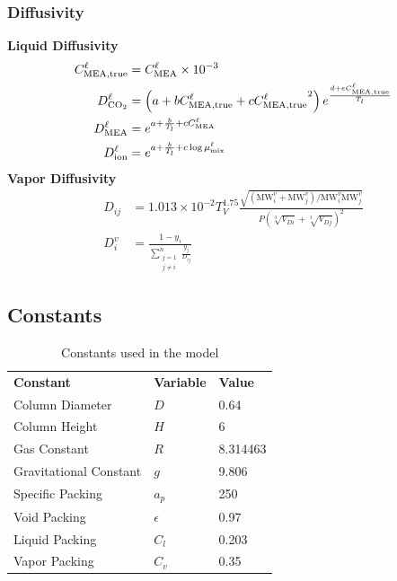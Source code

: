 \documentclass[a4paper,fleqn]{cas-sc}
\newcommand{\COtwo}{{\ce{CO2}}}
\newcommand{\MEA}{{\ce{MEA}}}
\newcommand{\liq}{\ell}
\newcommand{\vap}{v}
\begin{document}
    \subsubsection{Diffusivity}
    \textbf{Liquid Diffusivity}
    \begin{align}
        C^{\liq}_{\MEA,\text{true}} &= C^{\liq}_{\MEA} \times 10^{-3} \\
        D^{\liq}_{ \COtwo} &= \left(a + b C^{\liq}_{\MEA,\text{true}} + c {C^{\liq}_{\MEA,\text{true}}}^2\right) e^{\frac{d + e C^{\liq}_{\MEA,\text{true}}}{T_l}} \\
        D^{\liq}_{ \MEA} &= e^{a + \frac{b}{T_l} + c C^{\liq}_{\MEA}} \\
        D^{\liq}_{ \text{ion}} &= e^{a + \frac{b}{T_l} + c \log{\mu ^{\liq}_{ \text{mix}}}}
    \end{align}
    \vspace{.5cm}
    \textbf{Vapor Diffusivity}
    \begin{align}
        D_{i j} &= 1.013 \times 10^{-2} T_V^{1.75} \frac{\sqrt{\left(\text{MW}^{\vap}_{i}+\text{MW}^{\vap}_{j}\right) / \text{MW}^{\vap}_{i} \text{MW}^{\vap}_{j}}}{P\left(\sqrt[3]{V_{D i}}+\sqrt[3]{V_{D j}}\right)^2} \\
        D^{\vap}_{ i} &= \frac{1-y_i}{\sum_{\substack{j=1 \\ j \neq i}}^n \frac{y_j}{D_{i j}}}
    \end{align}

    \newpage
    \subsection{Constants}

    \begin{longtable}{lll}
        \label{tab:constants_table}\\
        \caption{Constants used in the model} \\
        \hline
        \textbf{Constant}      & \textbf{Variable} & \textbf{Value} \\
        \hline
        \endhead
%
        Column Diameter         & $D$               & 0.64           \\
        Column Height           & $H$               & 6              \\
        Gas Constant            & $R$               & 8.314463       \\
        Gravitational Constant  & $g$               & 9.806          \\
        Specific Packing        & $a_p$             & 250            \\
        Void Packing            & $\epsilon$        & 0.97           \\
        Liquid Packing          & $C_l$             & 0.203          \\
        Vapor Packing           & $C_v$             & 0.35           \\
        \hline
    \end{longtable}
\end{document}
